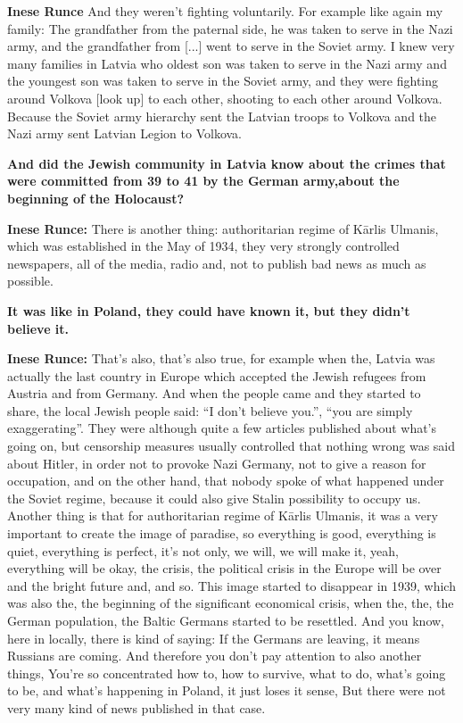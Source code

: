 \textbf{Inese Runce} And they weren't fighting voluntarily. For example like again my family: The grandfather from the paternal side, he was taken to serve in the Nazi army, and the grandfather from [...] went to serve in the Soviet army. I knew very many families in Latvia who oldest son was taken to serve in the Nazi army and the youngest son was taken to serve in the Soviet army, and they were fighting around Volkova [look up] to each other, shooting to each other around Volkova. Because the Soviet army hierarchy sent the Latvian troops to Volkova and the Nazi army sent Latvian Legion to Volkova.

\textbf{And did the Jewish community in Latvia know about the crimes that were committed from 39 to 41 by the German army,about the beginning of the Holocaust?}

\textbf{Inese Runce:} There is another thing: authoritarian regime of Kārlis Ulmanis, which was established in the May of 1934, they very strongly controlled newspapers, all of the media, radio and, not to publish bad news as much as possible.

\textbf{It was like in Poland, they could have known it, but they didn’t believe it.}

\textbf{Inese Runce:} That’s also, that’s also true, for example when the, Latvia was actually the last country in Europe which accepted the Jewish refugees from Austria and from Germany. And when the people came and they started to share, the local Jewish people said: ``I don’t believe you.'', ``you are simply exaggerating''.
They were although quite a few articles published about what’s going on, but censorship measures usually controlled that nothing wrong was said about Hitler, in order not to provoke Nazi Germany, not to give a reason for occupation, and on the other hand, that nobody spoke of what happened under the Soviet regime, because it could also give Stalin possibility to occupy us.\\
Another thing is that for authoritarian regime of Kārlis Ulmanis, it was a very important to create the image of paradise, so everything is good, everything is quiet, everything is perfect, it’s not only, we will, we will make it, yeah, everything will be okay, the crisis, the political crisis in the Europe will be over and the bright future and, and so. This image started to disappear in 1939, which was also the, the beginning of the significant economical crisis, when the, the, the German population, the Baltic Germans started to be resettled. And you know, here in locally, there is kind of saying: If the Germans are leaving, it means Russians are coming.
And therefore you don't pay attention to also another things, You're so concentrated how to, how to survive, what to do, what's going to be, and what's happening in Poland, it just loses it sense, But there were not very many kind of news published in that case.



